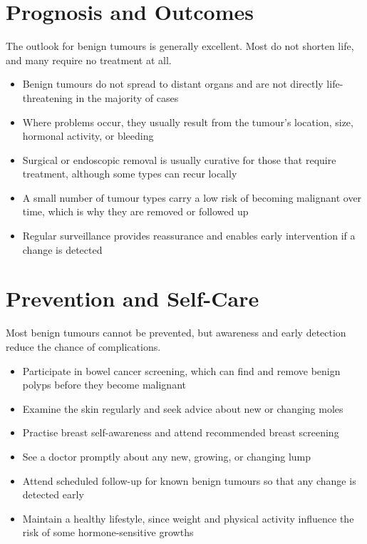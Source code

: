 \section*{Prognosis and Outcomes}
The outlook for benign tumours is generally excellent. Most do not shorten life, and many require no treatment at all.

\begin{itemize}
    \item Benign tumours do not spread to distant organs and are not directly life-threatening in the majority of cases
    \item Where problems occur, they usually result from the tumour's location, size, hormonal activity, or bleeding
    \item Surgical or endoscopic removal is usually curative for those that require treatment, although some types can recur locally
    \item A small number of tumour types carry a low risk of becoming malignant over time, which is why they are removed or followed up
    \item Regular surveillance provides reassurance and enables early intervention if a change is detected
\end{itemize}

\section*{Prevention and Self-Care}
Most benign tumours cannot be prevented, but awareness and early detection reduce the chance of complications.

\begin{itemize}
    \item Participate in bowel cancer screening, which can find and remove benign polyps before they become malignant
    \item Examine the skin regularly and seek advice about new or changing moles
    \item Practise breast self-awareness and attend recommended breast screening
    \item See a doctor promptly about any new, growing, or changing lump
    \item Attend scheduled follow-up for known benign tumours so that any change is detected early
    \item Maintain a healthy lifestyle, since weight and physical activity influence the risk of some hormone-sensitive growths
\end{itemize}

